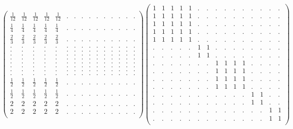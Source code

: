 \documentclass[12pt,a4paper]{amsart}
\begin{document}
\begin{align*}
\left(\begin{array}{rrrrrrrrrrrrrrr}%
\frac{1}{12}&\frac{1}{12}&\frac{1}{12}&\frac{1}{12}&\frac{1}{12}&.&.&.&.&.&.&.&.&.&.\\%
\frac14&\frac14&\frac14&\frac14&\frac14&.&.&.&.&.&.&.&.&.&.\\%
\frac23&\frac23&\frac23&\frac23&\frac23&.&.&.&.&.&.&.&.&.&.\\%
.&.&.&.&.&.&.&.&.&.&.&.&.&.&.\\%
.&.&.&.&.&.&.&.&.&.&.&.&.&.&.\\%
.&.&.&.&.&.&.&.&.&.&.&.&.&.&.\\%
.&.&.&.&.&.&.&.&.&.&.&.&.&.&.\\%
.&.&.&.&.&.&.&.&.&.&.&.&.&.&.\\%
.&.&.&.&.&.&.&.&.&.&.&.&.&.&.\\%
.&.&.&.&.&.&.&.&.&.&.&.&.&.&.\\%
.&.&.&.&.&.&.&.&.&.&.&.&.&.&.\\%
\frac12&\frac12&\frac12&\frac12&\frac12&.&.&.&.&.&.&.&.&.&.\\%
\frac12&\frac12&\frac12&\frac12&\frac12&.&.&.&.&.&.&.&.&.&.\\%
2&2&2&2&2&.&.&.&.&.&.&.&.&.&.\\%
2&2&2&2&2&.&.&.&.&.&.&.&.&.&.\\%
\end{array}\right)%
\left(\begin{array}{rrrrrrrrrrrrrrr}%
1&1&1&1&1&.&.&.&.&.&.&.&.&.&.\\%
1&1&1&1&1&.&.&.&.&.&.&.&.&.&.\\%
1&1&1&1&1&.&.&.&.&.&.&.&.&.&.\\%
1&1&1&1&1&.&.&.&.&.&.&.&.&.&.\\%
1&1&1&1&1&.&.&.&.&.&.&.&.&.&.\\%
.&.&.&.&.&1&1&.&.&.&.&.&.&.&.\\%
.&.&.&.&.&1&1&.&.&.&.&.&.&.&.\\%
.&.&.&.&.&.&.&1&1&1&1&.&.&.&.\\%
.&.&.&.&.&.&.&1&1&1&1&.&.&.&.\\%
.&.&.&.&.&.&.&1&1&1&1&.&.&.&.\\%
.&.&.&.&.&.&.&1&1&1&1&.&.&.&.\\%
.&.&.&.&.&.&.&.&.&.&.&1&1&.&.\\%
.&.&.&.&.&.&.&.&.&.&.&1&1&.&.\\%
.&.&.&.&.&.&.&.&.&.&.&.&.&1&1\\%
.&.&.&.&.&.&.&.&.&.&.&.&.&1&1\\%
\end{array}\right)%
\end{align*}
\end{document}
